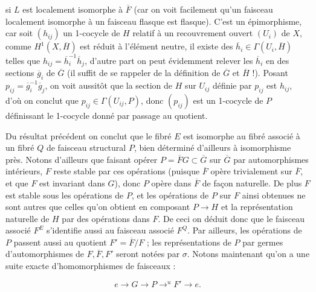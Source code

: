 
\noindent si $L$ est localement isomorphe à $\overline F$ (car on voit facilement
qu'un faisceau localement isomorphe à un faisceau flasque est flasque).
C'est un épimorphisme, car soit $(h_{ij})$ un 1-cocycle de $H$ relatif à un
recouvrement ouvert $(U_i)$ de $X$, comme $H^1(X,\overline H)$ est réduit à
l'élément neutre, il existe des $\overline h_i\in\Gamma(U_i,\overline H)$
telles que $h_{ij}=\overline h_i^{-1}\overline h_j$, d'autre part on peut
évidemment relever les $\overline h_i$ en des sections $\overline g_i$ de
$\overline G$ (il suffit de se rappeler de la définition de $\overline G$ et
$\overline H$ !). Posant $p_{ij}=\overline g_i^{-1}\overline g_j$, on voit
aussitôt que la section de $H$ sur $U_{ij}$ définie par $p_{ij}$ est $h_{ij}$,
d'où on conclut que $p_{ij}\in\Gamma(U_{ij},P)$, donc $(p_{ij})$ est un
1-cocycle de $P$ définissant le 1-cocycle donné par passage au quotient.

Du résultat précédent on conclut que le fibré $E$ est isomorphe au fibré
associé à un fibré $Q$ de faisceau structural $P$, bien déterminé d'ailleurs
à isomorphisme près.
Notons d'ailleurs que faisant opérer
$P=\overline F G\subset\overline G$ sur $\overline G$ par automorphismes
intérieurs, $F$ reste stable par ces opérations (puisque $\overline F$ opère
trivialement sur $\overline F$, et que $F$ est invariant dans $G$), donc $P$
opère dans $\overline F$ de façon naturelle. De plus $F$ est stable sous les
opérations de $P$, et les opérations de $P$ sur $F$ ainsi obtenues ne sont
autres que celles qu'on obtient en composant $P\to H$ et la
représentation naturelle de $H$ par des opérations dans $F$. De ceci on
déduit donc que le faisceau associé $F^E$ s'identifie aussi au faisceau
associé $F^Q$. Par ailleurs, les opérations de $P$ passent aussi au quotient
$F'=\overline F/F$ ; les représentations de $P$ par germes d'automorphismes
de $F,\overline F,F'$ seront notées par $\sigma$. Notons maintenant qu'on a
une suite exacte d'homomorphismes de faisceaux :

\[
e\to G\to P\mathop{\to}^{u}F'
\to e.
\]

